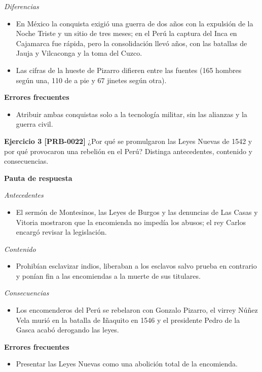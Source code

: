 \documentclass{book}
\begin{document}
\noindent\textit{Diferencias}
\begin{itemize}
\item En México la conquista exigió una guerra de dos años con la expulsión de la Noche Triste y un sitio de tres meses; en el Perú la captura del Inca en Cajamarca fue rápida, pero la consolidación llevó años, con las batallas de Jauja y Vilcaconga y la toma del Cuzco.
\item Las cifras de la hueste de Pizarro difieren entre las fuentes (165 hombres según una, 110 de a pie y 67 jinetes según otra).
\end{itemize}

\noindent\textbf{Errores frecuentes}
\begin{itemize}
\item Atribuir ambas conquistas solo a la tecnología militar, sin las alianzas y la guerra civil.
\end{itemize}

\noindent\textbf{Ejercicio 3 [PRB-0022]}
¿Por qué se promulgaron las Leyes Nuevas de 1542 y por qué provocaron una rebelión en el Perú? Distinga antecedentes, contenido y consecuencias.


\noindent\textbf{Pauta de respuesta}

\noindent\textit{Antecedentes}
\begin{itemize}
\item El sermón de Montesinos, las Leyes de Burgos y las denuncias de Las Casas y Vitoria mostraron que la encomienda no impedía los abusos; el rey Carlos encargó revisar la legislación.
\end{itemize}

\noindent\textit{Contenido}
\begin{itemize}
\item Prohibían esclavizar indios, liberaban a los esclavos salvo prueba en contrario y ponían fin a las encomiendas a la muerte de sus titulares.
\end{itemize}

\noindent\textit{Consecuencias}
\begin{itemize}
\item Los encomenderos del Perú se rebelaron con Gonzalo Pizarro, el virrey Núñez Vela murió en la batalla de Iñaquito en 1546 y el presidente Pedro de la Gasca acabó derogando las leyes.
\end{itemize}

\noindent\textbf{Errores frecuentes}
\begin{itemize}
\item Presentar las Leyes Nuevas como una abolición total de la encomienda.
\end{itemize}
\end{document}
